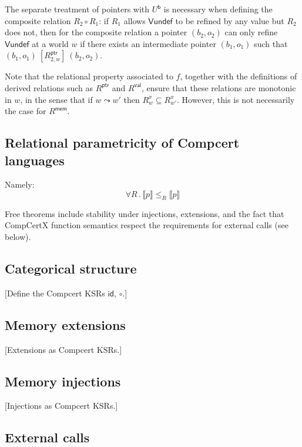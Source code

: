 \documentclass[acmsmall,anonymous]{acmart}
\newcommand{\kw}[1]{\ensuremath{ \textsf{#1} }}
\newcommand{\ifr}[1]{\ [{#1}]\ }
\begin{document}
The separate treatment of pointers with $U^\kw{b}$
is necessary when defining the composite relation $R_2 \circ R_1$:
if $R_1$ allows \kw{Vundef} to be refined by any value
but $R_2$ does not,
then for the composite relation
a pointer $(b_2, o_2)$ can only refine \kw{Vundef} at a world $w$
if there exists an intermediate pointer $(b_1, o_1)$
such that $(b_1, o_1) \ifr{R_{2,w}^\kw{ptr}} (b_2, o_2)$.

Note that the relational property associated to $f$,
together with the definitions of
derived relations such as $R^\kw{ptr}$ and $R^\kw{val}$,
ensure that these relations are monotonic in $w$,
in the sense that if $w \leadsto w'$
then $R^x_w \subseteq R^x_{w'}$.
However,
this is not necessarily the case for $R^\kw{mem}$.


\subsection{Relational parametricity of Compcert languages} %

Namely:
\[ \forall R \,.\, \llbracket p \rrbracket \le_R \llbracket p \rrbracket \]

Free theorems include
stability under injections, extensions,
and the fact that CompCertX function semantics
respect the requirements for external calls (see below).


\subsection{Categorical structure} %

[Define the Compcert KSRs \kw{id}, $\circ$.]


\subsection{Memory extensions} %

[Extensions as Compcert KSRs.]


\subsection{Memory injections} %

[Injections as Compcert KSRs.]


\subsection{External calls} %
\end{document}
